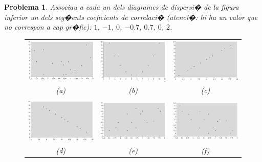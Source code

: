 \documentclass[a4paper,10pt]{article}
\newcounter{prbcont}
\newtheorem{problema}[prbcont]{Problema}
\begin{document}
\begin{problema}
Associau a cada un dels diagrames de dispersi� de la figura inferior 
un dels seg�ents coeficients de correlaci� (atenci�: hi ha un valor que
no correspon a cap gr�fic): $1$, $-1$, $0$, $-0.7$, $0.7$, $0$, $2$.

\begin{center}
\begin{figure}[htbp]
\begin{tabular}{ccc}
\includegraphics[width=5cm]{corr0.png} & 
\includegraphics[width=5cm]{corr0parabol.png} & 
\includegraphics[width=5cm]{corr1.png} \\
(a) & (b) & (c) \\ \\
\includegraphics[width=5cm]{corr1neg.png} & 
\includegraphics[width=5cm]{corr07.png} & 
\includegraphics[width=5cm]{corr07neg.png} \\
(d) & (e) & (f) 
\end{tabular}
\end{figure}
\end{center}  

\end{problema}
\end{document}
